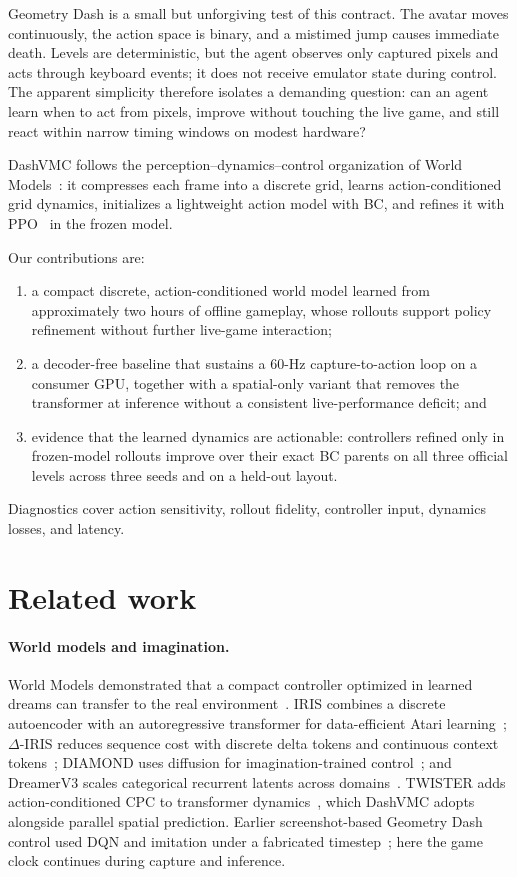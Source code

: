 Geometry Dash is a small but unforgiving test of this contract.
The avatar moves continuously, the action space is binary, and a mistimed jump causes immediate death.
Levels are deterministic, but the agent observes only captured pixels and acts through keyboard events; it does not receive emulator state during control.
The apparent simplicity therefore isolates a demanding question: can an agent learn when to act from pixels, improve without touching the live game, and still react within narrow timing windows on modest hardware?

DashVMC follows the perception--dynamics--control organization of World Models~\citep{ha2018world}: it compresses each frame into a discrete grid, learns action-conditioned grid dynamics, initializes a lightweight action model with BC, and refines it with PPO~\citep{schulman2017ppo} in the frozen model.

Our contributions are:
\begin{enumerate}
  \item a compact discrete, action-conditioned world model learned from approximately two hours of offline gameplay, whose rollouts support policy refinement without further live-game interaction;
  \item a decoder-free baseline that sustains a 60-Hz capture-to-action loop on a consumer GPU, together with a spatial-only variant that removes the transformer at inference without a consistent live-performance deficit; and
  \item evidence that the learned dynamics are actionable: controllers refined only in frozen-model rollouts improve over their exact BC parents on all three official levels across three seeds and on a held-out layout.
\end{enumerate}
Diagnostics cover action sensitivity, rollout fidelity, controller input, dynamics losses, and latency.

\FloatBarrier
\section{Related work}
\label{sec:related}

\paragraph{World models and imagination.}
World Models demonstrated that a compact controller optimized in learned dreams can transfer to the real environment~\citep{ha2018world}.
IRIS combines a discrete autoencoder with an autoregressive transformer for data-efficient Atari learning~\citep{micheli2023iris}; \(\Delta\)-IRIS reduces sequence cost with discrete delta tokens and continuous context tokens~\citep{micheli2024deltairis}; DIAMOND uses diffusion for imagination-trained control~\citep{alonso2024diamond}; and DreamerV3 scales categorical recurrent latents across domains~\citep{hafner2025dreamerv3}.
TWISTER adds action-conditioned CPC to transformer dynamics~\citep{burchi2025twister}, which DashVMC adopts alongside parallel spatial prediction.
Earlier screenshot-based Geometry Dash control used DQN and imitation under a fabricated timestep~\citep{li2017geometrydash}; here the game clock continues during capture and inference.

